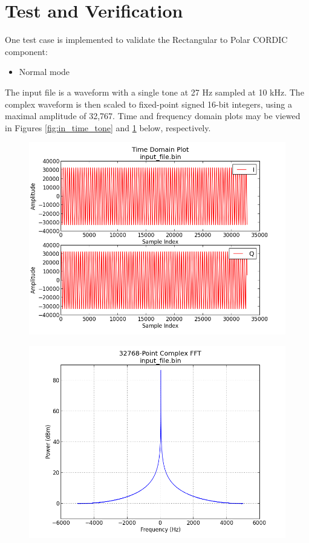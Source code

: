 \documentclass{article}
\def\Comp{Rectangular to Polar CORDIC}
\begin{document}
\section*{Test and Verification}
	One test case is implemented to validate the \Comp{} component:
	\begin{itemize}
		\item[1)] Normal mode
	\end{itemize}
	The input file is a waveform with a single tone at 27 Hz sampled at 10 kHz. The complex waveform is then scaled to fixed-point signed 16-bit integers, using a maximal amplitude of 32,767. Time and frequency domain plots may be viewed in Figures \ref{fig:in_time_tone} and \ref{fig:in_freq_tone} below, respectively.\par\medskip
	\begin{figure}[ht]
	\centering
	\begin{minipage}{.5\textwidth}
		\centering\includegraphics[width=1.0\linewidth]{input_time_tone}
		\label{fig:in_time_tone}
	\end{minipage}%
	\begin{minipage}{.5\textwidth}
		\centering\includegraphics[width=1.0\linewidth]{input_freq_tone}
		\label{fig:in_freq_tone}
	\end{minipage}
\end{figure}
\end{document}
